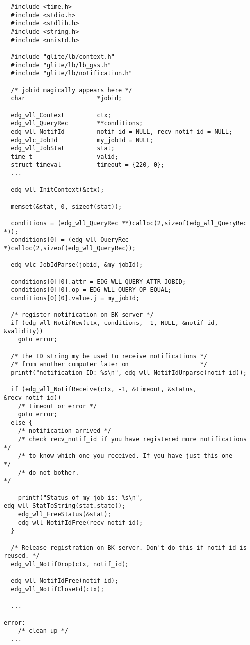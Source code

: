 \begin{verbatim}
  #include <time.h>
  #include <stdio.h>
  #include <stdlib.h>
  #include <string.h>
  #include <unistd.h>

  #include "glite/lb/context.h"
  #include "glite/lb/lb_gss.h"
  #include "glite/lb/notification.h"

  /* jobid magically appears here */
  char                    *jobid;

  edg_wll_Context         ctx;
  edg_wll_QueryRec        **conditions;
  edg_wll_NotifId         notif_id = NULL, recv_notif_id = NULL;
  edg_wlc_JobId           my_jobId = NULL;
  edg_wll_JobStat         stat;
  time_t                  valid;
  struct timeval          timeout = {220, 0};
  ...

  edg_wll_InitContext(&ctx);

  memset(&stat, 0, sizeof(stat));

  conditions = (edg_wll_QueryRec **)calloc(2,sizeof(edg_wll_QueryRec *));
  conditions[0] = (edg_wll_QueryRec *)calloc(2,sizeof(edg_wll_QueryRec));

  edg_wlc_JobIdParse(jobid, &my_jobId);

  conditions[0][0].attr = EDG_WLL_QUERY_ATTR_JOBID;
  conditions[0][0].op = EDG_WLL_QUERY_OP_EQUAL;
  conditions[0][0].value.j = my_jobId;

  /* register notification on BK server */
  if (edg_wll_NotifNew(ctx, conditions, -1, NULL, &notif_id, &validity))
    goto error;

  /* the ID string my be used to receive notifications */
  /* from another computer later on                    */
  printf("notification ID: %s\n", edg_wll_NotifIdUnparse(notif_id));

  if (edg_wll_NotifReceive(ctx, -1, &timeout, &status, &recv_notif_id))
    /* timeout or error */
    goto error;
  else {
    /* notification arrived */
    /* check recv_notif_id if you have registered more notifications */
    /* to know which one you received. If you have just this one     */
    /* do not bother.                                                */

    printf("Status of my job is: %s\n", edg_wll_StatToString(stat.state));
    edg_wll_FreeStatus(&stat);
    edg_wll_NotifIdFree(recv_notif_id);
  }

  /* Release registration on BK server. Don't do this if notif_id is reused. */
  edg_wll_NotifDrop(ctx, notif_id);

  edg_wll_NotifIdFree(notif_id);
  edg_wll_NotifCloseFd(ctx);
	
  ...

error:
	/* clean-up */
  ...

\end{verbatim}

